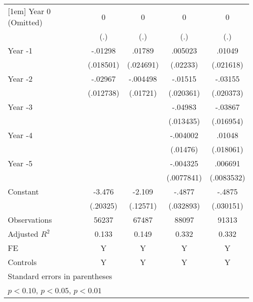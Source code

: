 \begin{table}[htbp]
\begin{tabular}{l*{4}{c}}
[1em]
Year 0 (Omitted)    &           0         &           0         &           0         &           0         \\
                    &         (.)         &         (.)         &         (.)         &         (.)         \\
[1em]
Year -1             &     -.01298         &      .01789         &     .005023         &      .01049         \\
                    &   (.018501)         &   (.024691)         &    (.02233)         &   (.021618)         \\
[1em]
Year -2             &     -.02967\sym{**} &    -.004498         &     -.01515         &     -.03155         \\
                    &   (.012738)         &    (.01721)         &   (.020361)         &   (.020373)         \\
[1em]
Year -3             &                     &                     &     -.04983\sym{***}&     -.03867\sym{**} \\
                    &                     &                     &   (.013435)         &   (.016954)         \\
[1em]
Year -4             &                     &                     &    -.004002         &      .01048         \\
                    &                     &                     &    (.01476)         &   (.018061)         \\
[1em]
Year -5             &                     &                     &    -.004325         &     .006691         \\
                    &                     &                     &  (.0077841)         &  (.0083532)         \\
[1em]
Constant            &      -3.476\sym{***}&      -2.109\sym{***}&      -.4877\sym{***}&      -.4875\sym{***}\\
                    &    (.20325)         &    (.12571)         &   (.032893)         &   (.030151)         \\
\hline
Observations        &       56237         &       67487         &       88097         &       91313         \\
Adjusted \(R^{2}\)  &       0.133         &       0.149         &       0.332         &       0.332         \\
FE                  &           Y         &           Y         &           Y         &           Y         \\
Controls            &           Y         &           Y         &           Y         &           Y         \\
\hline\hline
\multicolumn{5}{l}{\footnotesize Standard errors in parentheses}\\
\multicolumn{5}{l}{\footnotesize \sym{*} \(p<0.10\), \sym{**} \(p<0.05\), \sym{***} \(p<0.01\)}\\
\end{tabular}
\end{table}
